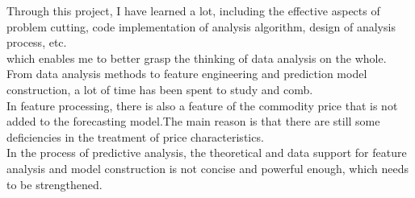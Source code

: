 \documentclass{tikzposter} %
\begin{document}
\begin{columns}
{
Through this project,
I have learned a lot, including the effective aspects of problem cutting,
code implementation of analysis algorithm, design of analysis process, etc.\\
which enables me to better grasp the thinking of data analysis on the whole.
From data analysis methods to feature engineering and prediction model construction,
a lot of time has been spent to study and comb.\\
In feature processing, there is also a feature of the commodity price that is not added
to the forecasting model.The main reason is that there are still some deficiencies 
in the treatment of price characteristics.\\
In the process of predictive analysis,
the theoretical and data support for feature analysis and model construction 
is not concise and powerful enough, which needs to be strengthened.\\


}





\end{columns}
\end{document}

